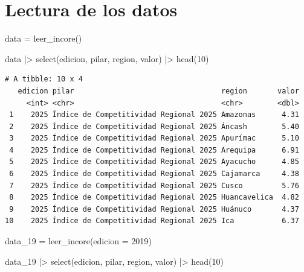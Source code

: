 \documentclass[
  11pt,
  letterpaper,
  DIV=11,
  numbers=noendperiod]{scrartcl}
\newenvironment{Shaded}{\begin{snugshade}}{\end{snugshade}}
\newcommand{\AttributeTok}[1]{\textcolor[rgb]{0.40,0.45,0.13}{#1}}
\newcommand{\DecValTok}[1]{\textcolor[rgb]{0.68,0.00,0.00}{#1}}
\newcommand{\FunctionTok}[1]{\textcolor[rgb]{0.28,0.35,0.67}{#1}}
\newcommand{\NormalTok}[1]{\textcolor[rgb]{0.00,0.23,0.31}{#1}}
\newcommand{\OtherTok}[1]{\textcolor[rgb]{0.00,0.23,0.31}{#1}}
\newcommand{\SpecialCharTok}[1]{\textcolor[rgb]{0.37,0.37,0.37}{#1}}
\begin{document}
\section{Lectura de los datos}\label{lectura-de-los-datos}

\begin{Shaded}
\begin{Highlighting}[]
\NormalTok{data }\OtherTok{=} \FunctionTok{leer\_incore}\NormalTok{()}

\NormalTok{data }\SpecialCharTok{|\textgreater{}}
  \FunctionTok{select}\NormalTok{(edicion, pilar, region, valor) }\SpecialCharTok{|\textgreater{}}
  \FunctionTok{head}\NormalTok{(}\DecValTok{10}\NormalTok{) }
\end{Highlighting}
\end{Shaded}

\begin{verbatim}
# A tibble: 10 x 4
   edicion pilar                                  region       valor
     <int> <chr>                                  <chr>        <dbl>
 1    2025 Índice de Competitividad Regional 2025 Amazonas      4.31
 2    2025 Índice de Competitividad Regional 2025 Áncash        5.40
 3    2025 Índice de Competitividad Regional 2025 Apurímac      5.10
 4    2025 Índice de Competitividad Regional 2025 Arequipa      6.91
 5    2025 Índice de Competitividad Regional 2025 Ayacucho      4.85
 6    2025 Índice de Competitividad Regional 2025 Cajamarca     4.38
 7    2025 Índice de Competitividad Regional 2025 Cusco         5.76
 8    2025 Índice de Competitividad Regional 2025 Huancavelica  4.82
 9    2025 Índice de Competitividad Regional 2025 Huánuco       4.37
10    2025 Índice de Competitividad Regional 2025 Ica           6.37
\end{verbatim}

\begin{Shaded}
\begin{Highlighting}[]
\NormalTok{data\_19 }\OtherTok{=} \FunctionTok{leer\_incore}\NormalTok{(}\AttributeTok{edicion =} \DecValTok{2019}\NormalTok{)}

\NormalTok{data\_19 }\SpecialCharTok{|\textgreater{}}
  \FunctionTok{select}\NormalTok{(edicion, pilar, region, valor) }\SpecialCharTok{|\textgreater{}}
  \FunctionTok{head}\NormalTok{(}\DecValTok{10}\NormalTok{)}
\end{Highlighting}
\end{Shaded}
\end{document}
